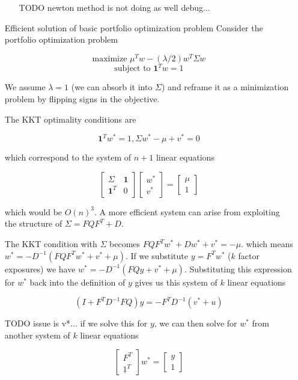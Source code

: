 \documentclass[12pt]{article}
\begin{document}
\begin{itemize}
\begin{itemize}
    TODO newton method is not doing as well debug...
  \end{itemize}

\item[Efficient solution of basic portfolio optimization problem]
  Consider the portfolio optimization problem

  $$\text{maximize    } \mu^T w - (\lambda / 2) w^T \Sigma w$$
  $$\text{subject to  } \textbf{1}^T w = 1$$

  We assume $\lambda = 1$ (we can absorb it into $\Sigma$) and reframe it as a minimization problem by flipping signs in the objective.

  The KKT optimality conditions are

  $$\textbf{1}^T w^* = 1, \Sigma w^* - \mu + v^* = 0$$

  which correspond to the system of $n + 1$ linear equations

  $$\begin{bmatrix}
    \Sigma & \textbf{1} \\
    \textbf{1}^T & 0
  \end{bmatrix} \begin{bmatrix}
    w^* \\
    v^*
    \end{bmatrix} = \begin{bmatrix}
    \mu \\
    1
    \end{bmatrix}$$

    which would be $O(n)^3$. A more efficient system can arise from exploiting the structure of $\Sigma = FQF^T + D$.

    The KKT condition with $\Sigma$ becomes $FQF^T w^* + Dw^* + v^* = -\mu$. which means $w^* = -D^{-1} \left(FQF^Tw^* + v^* + \mu \right)$. If we substitute $y = F^T w^*$ ($k$ factor exposures) we have $w^* = -D^{-1} \left(FQy + v^* + \mu \right)$. Substituting this expression for $w^*$ back into the definition of $y$ gives us this system of $k$ linear equations

    $$\left(I + F^T D^{-1}FQ \right) y = -F^T D^{-1} (v^* + u)$$

    TODO issue is v*...
    if we solve this for $y$, we can then solve for $w^*$ from another system of $k$ linear equations

    $$\begin{bmatrix} F^T \\ 1^T \end{bmatrix} w^* = \begin{bmatrix} y \\ 1 \end{bmatrix}$$


\end{itemize}
\end{document}
